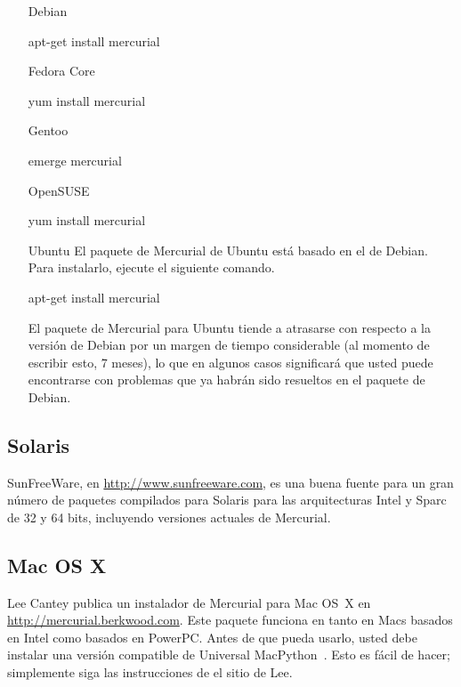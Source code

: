 \begin{itemize}
\item[Debian]
  \begin{codesample4}
    apt-get install mercurial
  \end{codesample4}

\item[Fedora Core]
  \begin{codesample4}
    yum install mercurial
  \end{codesample4}

\item[Gentoo]
  \begin{codesample4}
    emerge mercurial
  \end{codesample4}

\item[OpenSUSE]
  \begin{codesample4}
    yum install mercurial
  \end{codesample4}

\item[Ubuntu] El paquete de Mercurial de Ubuntu está basado en el de
    Debian. Para instalarlo, ejecute el siguiente comando.
  \begin{codesample4}
    apt-get install mercurial
  \end{codesample4}
  El paquete de Mercurial para Ubuntu tiende a atrasarse con respecto
  a la versión de Debian por un margen de tiempo considerable
  (al momento de escribir esto, 7 meses), lo que en algunos casos
  significará que usted puede encontrarse con problemas que ya habrán
  sido resueltos en el paquete de Debian.
\end{itemize}

\subsection{Solaris}

SunFreeWare, en \url{http://www.sunfreeware.com}, es una buena fuente
para un gran número de paquetes compilados para Solaris para las
arquitecturas Intel y Sparc de 32 y 64 bits, incluyendo versiones
actuales de Mercurial.

\subsection{Mac OS X}

Lee Cantey publica un instalador de Mercurial para Mac OS~X en 
\url{http://mercurial.berkwood.com}.  Este paquete funciona en tanto
en Macs basados en Intel como basados en PowerPC. Antes de que pueda
usarlo, usted debe instalar una versión compatible de Universal
MacPython~\cite{web:macpython}. Esto es fácil de hacer; simplemente
siga las instrucciones de el sitio de Lee.

